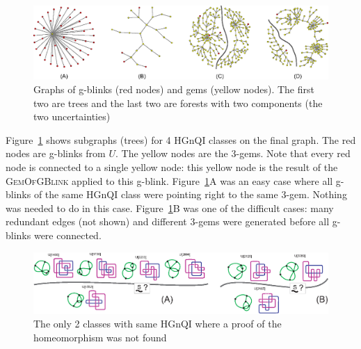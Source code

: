 \begin{figure}[htp]
   \begin{center}
      \leavevmode
      \includegraphics[width=15cm]{A.figs/subgraphs.eps}
   \end{center}
   \vspace{-0.7cm}
   \caption{Graphs of g-blinks (red nodes) and gems (yellow nodes). The first two are trees
   and the last two are forests with two components (the two uncertainties)}
   \label{fig:subgraphs}
\end{figure}

Figure~\ref{fig:subgraphs} shows subgraphs (trees) for 4 HGnQI
classes on the final graph. The red nodes are g-blinks from $U$. The
yellow nodes are the 3-gems. Note that every red node is connected
to a single yellow node: this yellow node is the result of the
\textsc{GemOfGBlink} applied to this g-blink.
Figure~\ref{fig:subgraphs}A was an easy case where all g-blinks
of the same HGnQI class were pointing right to the same 3-gem.
Nothing was needed to do in this case. Figure~\ref{fig:subgraphs}B
was one of the difficult cases: many redundant edges (not shown) and
different 3-gems were generated before all g-blinks were connected.
\begin{figure}[htp]
   \begin{center}
      \leavevmode
      \includegraphics[width=16cm]{A.figs/doubts.eps}
   \end{center}
   \vspace{-0.7cm}
   \caption{ The only 2 classes with same HGnQI where a proof of the homeomorphism was not found}
   \label{fig:doubts}
\end{figure}

